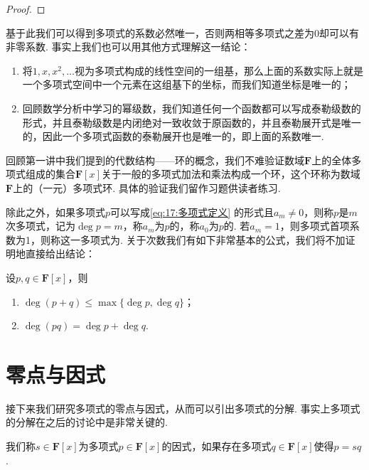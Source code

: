 \begin{proof}

\end{proof}

基于此我们可以得到多项式的系数必然唯一，否则两相等多项式之差为0却可以有非零系数. 事实上我们也可以用其他方式理解这一结论：
\begin{enumerate}
    \item 将$1,x,x^2,\ldots$视为多项式构成的线性空间的一组基，那么上面的系数实际上就是一个多项式空间中一个元素在这组基下的坐标，而我们知道坐标是唯一的；

    \item 回顾数学分析中学习的幂级数，我们知道任何一个函数都可以写成泰勒级数的形式，并且泰勒级数是内闭绝对一致收敛于原函数的，并且泰勒展开式是唯一的，因此一个多项式函数的泰勒展开也是唯一的，即上面的系数唯一.
\end{enumerate}

回顾第一讲中我们提到的代数结构——环的概念，我们不难验证数域$\mathbf{F}$上的全体多项式组成的集合$\mathbf{F}[x]$关于一般的多项式加法和乘法构成一个环，这个环称为数域$\mathbf{F}$上的（一元）多项式环. 具体的验证我们留作习题供读者练习.

除此之外，如果多项式$p$可以写成\autoref{eq:17:多项式定义} 的形式且$a_m\neq 0$，则称$p$是$m$次多项式，记为$\deg p=m$，称$a_m$为$p$的，称$a_0$为$p$的. 若$a_m=1$，则多项式首项系数为1，则称这一多项式为. 关于次数我们有如下非常基本的公式，我们将不加证明地直接给出结论：
\begin{theorem}
    设$p,q\in\mathbf{F}[x]$，则
    \begin{enumerate}
        \item $\deg(p+q)\leqslant \max\{\deg p,\deg q\}$；

        \item $\deg(pq)=\deg p+\deg q$.
    \end{enumerate}
\end{theorem}

\section{零点与因式}

接下来我们研究多项式的零点与因式，从而可以引出多项式的分解. 事实上多项式的分解在之后的讨论中是非常关键的.
\begin{definition}
    我们称$s\in\mathbf{F}[x]$为多项式$p\in\mathbf{F}[x]$的因式，如果存在多项式$q\in\mathbf{F}[x]$使得$p=sq$.
\end{definition}

